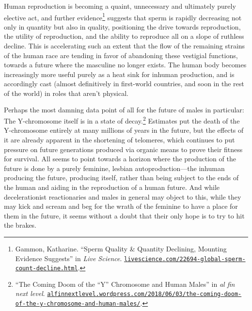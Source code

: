 \documentclass[10pt, statementpaper, twoside, openright]{memoir}
\begin{document}
Human reproduction is becoming a quaint, unnecessary and ultimately purely elective act, and further evidence\footnote{Gammon, Katharine. ``Sperm Quality \& Quantity Declining, Mounting Evidence Suggests'' in \textit{Live Science}. \href{https://www.livescience.com/22694-global-sperm-count-decline.html}{\nolinkurl{livescience.com/22694-global-sperm-count-decline.html}}.} suggests that sperm is rapidly decreasing not only in quantity but also in quality, positioning the drive towards reproduction, the utility of reproduction, and the ability to reproduce all on a slope of ruthless decline. This is accelerating such an extent that the flow of the remaining strains of the human race are tending in favor of abandoning these vestigial functions, towards a future where the masculine no longer exists. The human body becomes increasingly more useful purely as a heat sink for inhuman production, and is accordingly cast (almost definitively in first-world countries, and soon in the rest of the world) in roles that aren't physical.

Perhaps the most damning data point of all for the future of males in particular: The Y-chromosome itself is in a state of decay.\footnote{``The Coming Doom of the ``Y'' Chromosome and Human Males'' in \textit{al fin next level}. \href{https://alfinnextlevel.wordpress.com/2018/06/03/the-coming-doom-of-the-y-chromosome-and-human-males/}{\nolinkurl{alfinnextlevel.wordpress.com/2018/06/03/the-coming-doom-of-the-y-chromosome-and-human-males/}}.} Estimates put the death of the Y-chromosome entirely at many millions of years in the future, but the effects of it are already apparent in the shortening of telomeres, which continues to put pressure on future generations produced via organic means to prove their fitness for survival. All seems to point towards a horizon where the production of the future is done by a purely feminine, lesbian autoproduction---the inhuman producing the future, producing itself, rather than being subject to the ends of the human and aiding in the reproduction of a human future. And while decelerationist reactionaries and males in general may object to this, while they may kick and scream and beg for the wrath of the feminine to have a place for them in the future, it seems without a doubt that their only hope is to try to hit the brakes.
\end{document}
